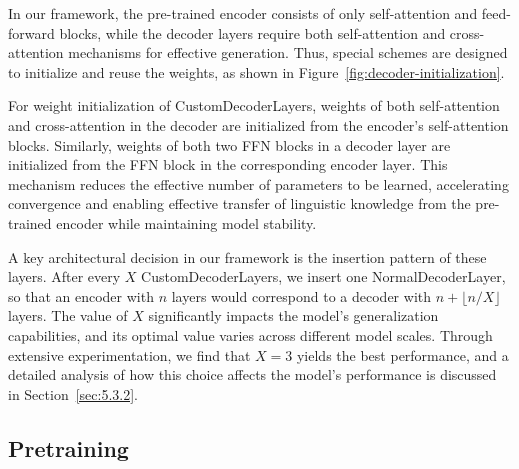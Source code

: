 In our framework, the pre-trained encoder consists of only self-attention and feed-forward blocks, while the decoder layers require both self-attention and cross-attention mechanisms for effective generation. Thus, special schemes are designed to initialize and reuse the weights, as shown in Figure~\ref{fig:decoder-initialization}.

For weight initialization of CustomDecoderLayers, weights of both self-attention and cross-attention in the decoder are initialized from the encoder's self-attention blocks. Similarly, weights of both two FFN blocks in a decoder layer are initialized from the FFN block in the corresponding encoder layer. This mechanism reduces the effective number of parameters to be learned, accelerating convergence and enabling effective transfer of linguistic knowledge from the pre-trained encoder while maintaining model stability.



A key architectural decision in our framework is the insertion pattern of these layers. After every $X$ CustomDecoderLayers, we insert one NormalDecoderLayer, so that an encoder with $n$ layers would correspond to a decoder with $n + \lfloor n / X\rfloor$ layers. The value of $X$ significantly impacts the model’s generalization capabilities, and its optimal value varies across different model scales. Through extensive experimentation, we find that $X=3$ yields the best performance, and a detailed analysis of how this choice affects the model's performance is discussed in Section~\ref{sec:5.3.2}.


\subsection{Pretraining}
